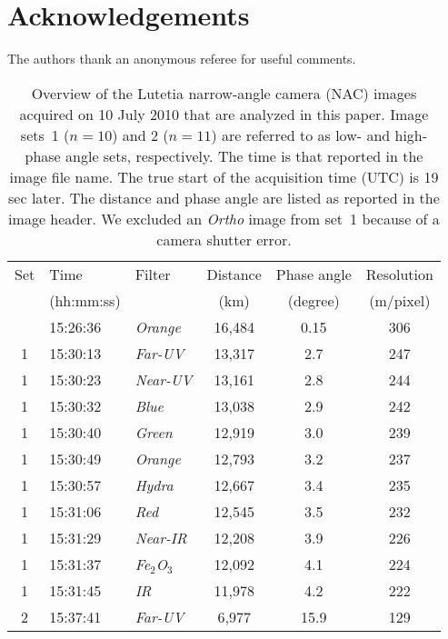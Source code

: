 \documentclass[3p,authoryear]{elsarticle}
\begin{document}
\section*{Acknowledgements}

The authors thank an anonymous referee for useful comments.







\newpage
\clearpage

\begin{table}
\centering
\caption{Overview of the Lutetia narrow-angle camera (NAC) images acquired on 10 July 2010 that are analyzed in this paper. Image sets~1 ($n=10$) and 2 ($n=11$) are referred to as low- and high-phase angle sets, respectively. The time is that reported in the image file name. The true start of the acquisition time (UTC) is 19 sec later. The distance and phase angle are listed as reported in the image header. We excluded an {\it Ortho} image from set~1 because of a camera shutter error.}
\vspace{5mm}
\begin{tabular}{cllccc}
\hline
Set & Time       & Filter        & Distance & Phase angle & Resolution \\
    & (hh:mm:ss) &               & (km)     & (degree)    & (m/pixel) \\
\hline
  & 15:26:36 & {\it Orange}      & 16,484 & 0.15 & 306 \\
1 & 15:30:13 & {\it Far-UV}      & 13,317 & 2.7 & 247 \\
1 & 15:30:23 & {\it Near-UV}     & 13,161 & 2.8 & 244 \\
1 & 15:30:32 & {\it Blue}        & 13,038 & 2.9 & 242 \\
1 & 15:30:40 & {\it Green}       & 12,919 & 3.0 & 239 \\
1 & 15:30:49 & {\it Orange}      & 12,793 & 3.2 & 237 \\
1 & 15:30:57 & {\it Hydra}       & 12,667 & 3.4 & 235 \\
1 & 15:31:06 & {\it Red}         & 12,545 & 3.5 & 232 \\
1 & 15:31:29 & {\it Near-IR}     & 12,208 & 3.9 & 226 \\
1 & 15:31:37 & {\it Fe$_2$O$_3$} & 12,092 & 4.1 & 224 \\
1 & 15:31:45 & {\it IR}          & 11,978 & 4.2 & 222 \\
2 & 15:37:41 & {\it Far-UV}      & 6,977 & 15.9 & 129 \\

\end{tabular}
\end{table}
\end{document}
